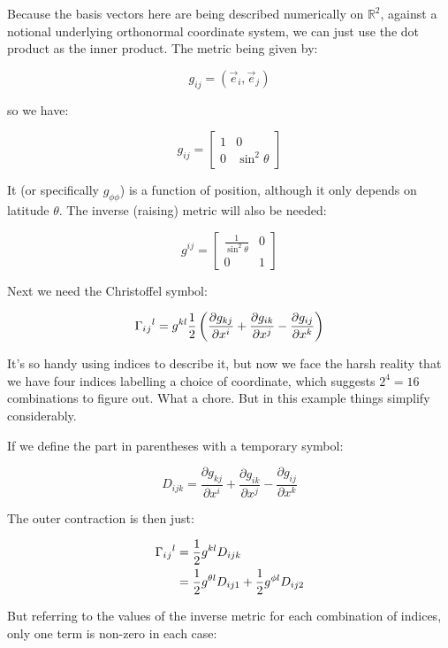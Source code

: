Because the basis vectors here are being described numerically on $\mathbb{R}^2$, against a notional underlying orthonormal coordinate system, we can just use the dot product as the inner product. The metric being given by:

$$
g_{ij} = (\vec{e}_i,\vec{e}_j)
$$

so we have:

$$
g_{ij} = \begin{bmatrix}1 & 0 \\ 0 & \sin^2 \theta\end{bmatrix} 
$$

It (or specifically $g_{\phi\phi}$) is a function of position, although it only depends on latitude $\theta$. The inverse (raising) metric will also be needed:

$$
g^{ij} = \begin{bmatrix}\frac{1}{\sin^2 \theta} & 0 \\ 0 & 1\end{bmatrix} 
$$

Next we need the Christoffel symbol:

$$
\Gamma\indices{_i_j^l}
=
g^{kl}
\frac{1}{2}
\left(
\frac{\partial g_{kj}}{\partial x^i} 
+
\frac{\partial g_{ik}}{\partial x^j} 
-
\frac{\partial g_{ij}}{\partial x^k} 
\right)
$$

It's so handy using indices to describe it, but now we face the harsh reality that we have four indices labelling a choice of coordinate, which suggests $2^4=16$ combinations to figure out. What a chore. But in this example things simplify considerably.

If we define the part in parentheses with a temporary symbol:

$$
D_{ijk} 
= 
\frac{\partial g_{kj}}{\partial x^i} 
+
\frac{\partial g_{ik}}{\partial x^j} 
-
\frac{\partial g_{ij}}{\partial x^k} 
$$

The outer contraction is then just:

\begin{equation}    
\begin{split}
\Gamma\indices{_i_j^l}
&= \frac{1}{2} g^{kl} D_{ijk} \\
&= \frac{1}{2} g^{\theta l} D_{ij1} + \frac{1}{2} g^{\phi l} D_{ij2}
\end{split}
\end{equation}

But referring to the values of the inverse metric for each combination of indices, only one term is non-zero in each case:

